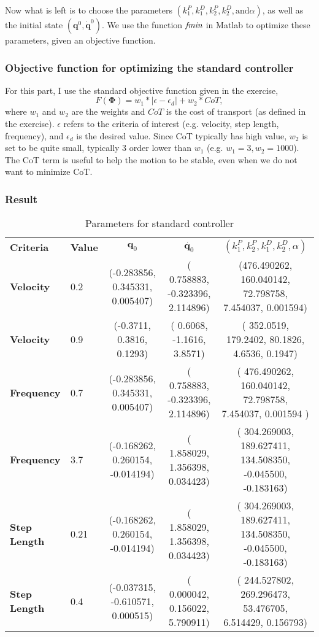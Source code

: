 Now what is left is to choose the parameters $(k_1^P, k_1^D, k_2^P, k_2^D, \text{and} \alpha)$, as well as the initial state $(\bm{q}^0, \dot{\bm{q}}^0)$. We use the function $\emph{fmin}$ in Matlab to optimize these parameters, given an objective function. 

\subsubsection{Objective function for optimizing the standard controller}
For this part, I use the standard objective function given in the exercise,
\begin{equation}
F(\bm{\Phi}) = w_1*|\epsilon - \epsilon_d| + w_2*CoT,
\end{equation}
where $w_1$ and $w_2$ are the weights and $CoT$ is the cost of transport (as defined in the exercise). $\epsilon$ refers to the criteria of interest (e.g. velocity, step length, frequency), and $\epsilon_d$ is the desired value. Since CoT typically has high value, $w_2$ is set to be quite small, typically 3 order lower than $w_1$ (e.g. $w_1 = 3, w_2 = 1000$). The CoT term is useful to help the motion to be stable, even when we do not want to minimize CoT. 

\subsubsection{Result}



\renewcommand{\arraystretch}{1.}
\begin{table}[!t]
	\centering    
      \caption{Parameters for standard controller}
      \label{tab:standard_result}
		
	\begin{tabular}{l l | c  c  c }
		\toprule
\bf{Criteria} & \bf{Value} & $\bm{q}_0$ & $\dot{\bm{q}_0}$ & $(k_1^P, k_2^P, k_1^D, k_2^D, \alpha)$ \\
\bf{Velocity} & 0.2 & (-0.283856, 0.345331, 0.005407) & ( 0.758883, -0.323396, 2.114896) & (476.490262, 160.040142, 72.798758, 7.454037, 0.001594) \\
\bf{Velocity} & 0.9 & (-0.3711,   0.3816,   0.1293) & (  0.6068,  -1.1616,   3.8571) & ( 352.0519, 179.2402,  80.1826,   4.6536,   0.1947) \\
\bf{Frequency} & 0.7 & (-0.283856, 0.345331, 0.005407) & ( 0.758883, -0.323396, 2.114896) & ( 476.490262, 160.040142, 72.798758, 7.454037, 0.001594 )\\
\bf{Frequency} & 3.7 & (-0.168262, 0.260154, -0.014194) & ( 1.858029, 1.356398, 0.034423) & ( 304.269003, 189.627411, 134.508350, -0.045500, -0.183163) \\
\bf{Step Length} & 0.21 & (-0.168262, 0.260154, -0.014194) & ( 1.858029, 1.356398, 0.034423) & ( 304.269003, 189.627411, 134.508350, -0.045500, -0.183163) \\
\bf{Step Length} & 0.4 & (-0.037315, -0.610571, 0.000515) & ( 0.000042, 0.156022, 5.790911) & ( 244.527802, 269.296473, 53.476705, 6.514429, 0.156793) 
	\end{tabular}
\end{table}